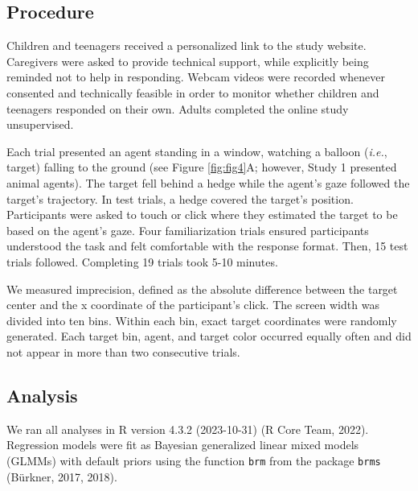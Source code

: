 \documentclass[
  man,mask,floatsintext]{apa7}
\begin{document}
\hypertarget{procedure}{%
\subsection{Procedure}\label{procedure}}

Children and teenagers received a personalized link to the study website. Caregivers were asked to provide technical support, while explicitly being reminded not to help in responding. Webcam videos were recorded whenever consented and technically feasible in order to monitor whether children and teenagers responded on their own. Adults completed the online study unsupervised.

Each trial presented an agent standing in a window, watching a balloon (\emph{i.e.}, target) falling to the ground (see Figure \ref{fig:fig4}A; however, Study 1 presented animal agents). The target fell behind a hedge while the agent's gaze followed the target's trajectory. In test trials, a hedge covered the target's position. Participants were asked to touch or click where they estimated the target to be based on the agent's gaze. Four familiarization trials ensured participants understood the task and felt comfortable with the response format. Then, 15 test trials followed. Completing 19 trials took 5-10 minutes.

We measured imprecision, defined as the absolute difference between the target center and the x coordinate of the participant's click. The screen width was divided into ten bins. Within each bin, exact target coordinates were randomly generated. Each target bin, agent, and target color occurred equally often and did not appear in more than two consecutive trials.

\hypertarget{analysis}{%
\subsection{Analysis}\label{analysis}}

We ran all analyses in R version 4.3.2 (2023-10-31) (R Core Team, 2022). Regression models were fit as Bayesian generalized linear mixed models (GLMMs) with default priors using the function \texttt{brm} from the package \texttt{brms} (Bürkner, 2017, 2018).
\end{document}
